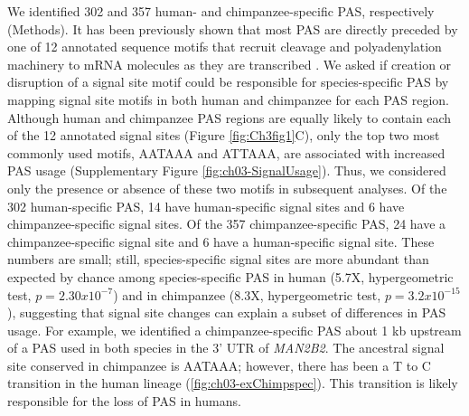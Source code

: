 We identified 302 and 357 human- and chimpanzee-specific PAS, respectively (Methods). It has been previously shown that most PAS are directly preceded by one of 12 annotated sequence motifs that recruit cleavage and polyadenylation machinery to mRNA molecules as they are transcribed \citep{beaudoing_patterns_2000}. We asked if creation or disruption of a signal site motif could be responsible for species-specific PAS by  mapping  signal site motifs in both human and chimpanzee for each PAS region. Although human and chimpanzee PAS regions are equally likely to contain each of the 12 annotated signal sites (Figure \ref{fig:Ch3fig1}C), only the top two most commonly used motifs, AATAAA and ATTAAA, are associated with increased PAS usage (Supplementary Figure \ref{fig:ch03-SignalUsage}). Thus, we considered only the presence or absence of these two motifs in subsequent analyses. Of the 302 human-specific PAS, 14 have human-specific signal sites and 6 have chimpanzee-specific signal sites. Of the 357 chimpanzee-specific PAS, 24 have a chimpanzee-specific signal site and 6 have a human-specific signal site. These numbers are small; still, species-specific signal sites are more abundant than expected by chance among species-specific PAS in human (5.7X, hypergeometric test, $p=2.30x10^{-7}$) and in chimpanzee (8.3X, hypergeometric test, $p=3.2x10^{-15}$), suggesting that signal site changes can explain a subset of differences in PAS usage. For example, we identified a chimpanzee-specific PAS about 1 kb upstream of a PAS used in both species in the 3' UTR of \emph{MAN2B2}. The ancestral signal site conserved in chimpanzee is AATAAA; however, there has been a T to C transition in the human lineage \citep{blanchette_aligning_2004} (\ref{fig:ch03-exChimpspec}). This transition is likely responsible for the loss of PAS in humans.


